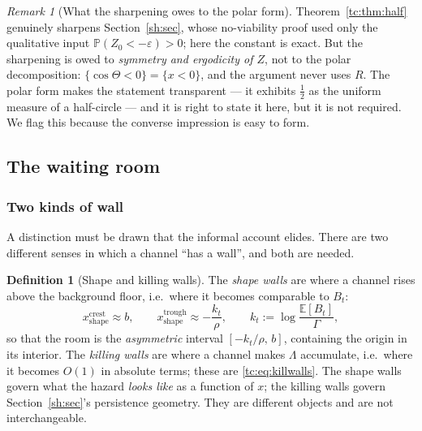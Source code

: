 \documentclass[11pt]{article}
\numberwithin{equation}{section}
\theoremstyle{plain}
\theoremstyle{definition}
\newtheorem{definition}[theorem]{Definition}
\theoremstyle{remark}
\newtheorem{remark}[theorem]{Remark}
\newcommand{\E}{\mathbb{E}}
\newcommand{\PP}{\mathbb{P}}
\begin{document}
\begin{remark}[What the sharpening owes to the polar form]
\label{tc:rem:owes}
Theorem~\ref{tc:thm:half} genuinely sharpens Section~\ref{sh:sec}, whose
no-viability proof used only the qualitative input
$\PP(Z_0<-\varepsilon)>0$; here the constant is exact. But the
sharpening is owed to \emph{symmetry and ergodicity of $Z$}, not to the
polar decomposition: $\{\cos\Theta<0\}=\{x<0\}$, and the argument never
uses $R$. The polar form makes the statement transparent --- it exhibits
$\tfrac12$ as the uniform measure of a half-circle --- and it is right
to state it here, but it is not required. We flag this because the
converse impression is easy to form.
\end{remark}

\subsection{The waiting room}\label{tc:sub:room}

\subsubsection{Two kinds of wall}\label{tc:subsub:twowalls}

A distinction must be drawn that the informal account elides. There are
two different senses in which a channel ``has a wall'', and both are
needed.

\begin{definition}[Shape and killing walls]\label{tc:def:walls}
The \emph{shape walls} are where a channel rises above the background
floor, i.e.\ where it becomes comparable to $B_t$:
\begin{equation}\label{tc:eq:shapewalls}
x^{\mathrm{crest}}_{\mathrm{shape}}\approx b,
\qquad
x^{\mathrm{trough}}_{\mathrm{shape}}\approx-\frac{k_t}{\rho},
\qquad
k_t:=\log\frac{\E[B_t]}{\Gamma},
\end{equation}
so that the room is the \emph{asymmetric} interval $[-k_t/\rho,\,b]$,
containing the origin in its interior.
The \emph{killing walls} are where a channel makes $\Lambda$ accumulate,
i.e.\ where it becomes $O(1)$ in absolute terms; these are
\eqref{tc:eq:killwalls}. The shape walls govern what the hazard
\emph{looks like} as a function of $x$; the killing walls govern
Section~\ref{sh:sec}'s persistence geometry. They are different objects and are
not interchangeable.
\end{definition}
\end{document}
